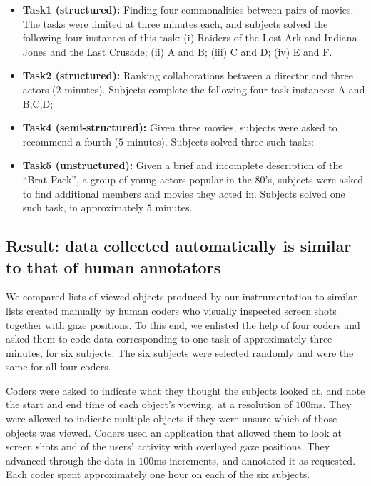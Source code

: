 \begin{itemize}
	\item \textbf{Task1 (structured):} Finding four commonalities between pairs of movies. The tasks were limited at three minutes each, and subjects solved the following four instances of this task: (i) Raiders of the Lost Ark and Indiana Jones and the Last Crusade; (ii) A and B; (iii) C and D; (iv) E and F.  
	\item \textbf{Task2 (structured):} Ranking collaborations between a director and three actors ($2$ minutes).  Subjects complete the following four task instances: A and B,C,D; 
	\item \textbf{Task4 (semi-structured):} Given three movies, subjects were asked to recommend a fourth ($5$ minutes). Subjects solved three such tasks: 
	\item \textbf{Task5 (unstructured):} Given a brief and incomplete description of the ``Brat Pack'', a group of young actors popular in the 80's, subjects were asked to find additional members and movies they acted in. Subjects solved one such task, in approximately $5$ minutes. 
\end{itemize}

\subsection{Result: data collected automatically is similar to that of human annotators}
\label{sec:EvalResults}

We compared lists of viewed objects produced by our instrumentation to similar lists created manually by human coders who visually inspected screen shots together with gaze positions. To this end, we enlisted the help of four coders and asked them to code data corresponding to one task of approximately three minutes, for six subjects. The six subjects were selected randomly and were the same for all four coders. 

Coders were asked to indicate what they thought the subjects looked at, and note the start and end time of each object's viewing, at a resolution of $100$ms. They were allowed to indicate multiple objects if they were unsure which of those objects was viewed. Coders used an application that allowed them to look at screen shots and of the users' activity with overlayed gaze positions. They  advanced through the data in $100$ms increments, and annotated it as requested. Each coder spent approximately one hour on each of the six subjects.

